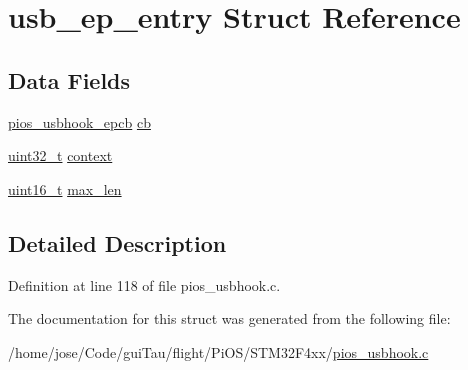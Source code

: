 \hypertarget{structusb__ep__entry}{\section{usb\-\_\-ep\-\_\-entry Struct Reference}
\label{structusb__ep__entry}
}
\subsection*{Data Fields}
\begin{DoxyCompactItemize}
\item 
\hyperlink{group___p_i_o_s___u_s_b_h_o_o_k_ga5f7904cd3922ab7207afebe3d9ef2650}{pios\-\_\-usbhook\-\_\-epcb} \hyperlink{group___p_i_o_s___u_s_b_h_o_o_k_gaf0106468de445de05247315a6001789c}{cb}
\item 
\hyperlink{stdint_8h_a435d1572bf3f880d55459d9805097f62}{uint32\-\_\-t} \hyperlink{group___p_i_o_s___u_s_b_h_o_o_k_ga044e4671681d96fdf1918abb9e52542e}{context}
\item 
\hyperlink{stdint_8h_a273cf69d639a59973b6019625df33e30}{uint16\-\_\-t} \hyperlink{group___p_i_o_s___u_s_b_h_o_o_k_ga010957cf5bf2628ba64249b8c1271f91}{max\-\_\-len}
\end{DoxyCompactItemize}


\subsection{Detailed Description}


Definition at line 118 of file pios\-\_\-usbhook.\-c.



The documentation for this struct was generated from the following file\-:\begin{DoxyCompactItemize}
\item 
/home/jose/\-Code/gui\-Tau/flight/\-Pi\-O\-S/\-S\-T\-M32\-F4xx/\hyperlink{_s_t_m32_f4xx_2pios__usbhook_8c}{pios\-\_\-usbhook.\-c}\end{DoxyCompactItemize}
